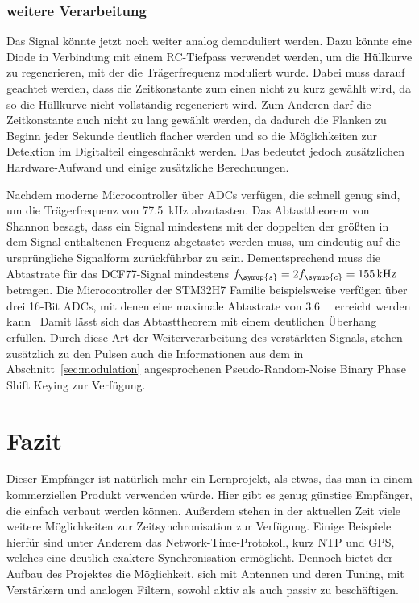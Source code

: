 \documentclass[a4paper]{scrartcl}
\begin{document}
\subsubsection{weitere Verarbeitung}
Das Signal könnte jetzt noch weiter analog demoduliert werden. Dazu könnte eine Diode in Verbindung mit einem RC-Tiefpass verwendet werden, um die Hüllkurve zu regenerieren, mit der die Trägerfrequenz moduliert wurde.
Dabei muss darauf geachtet werden, dass die Zeitkonstante zum einen nicht zu kurz gewählt wird, da so die Hüllkurve nicht vollständig regeneriert wird.
Zum Anderen darf die Zeitkonstante auch nicht zu lang gewählt werden, da dadurch die Flanken zu Beginn jeder Sekunde deutlich flacher werden und so die Möglichkeiten zur Detektion im Digitalteil eingeschränkt werden.
Das bedeutet jedoch zusätzlichen Hardware-Aufwand und einige zusätzliche Berechnungen.

Nachdem moderne Microcontroller über ADCs verfügen, die schnell genug sind, um die Trägerfrequenz von \qty{77.5}{\kHz} abzutasten.
Das Abtasttheorem von Shannon besagt, dass ein Signal mindestens mit der doppelten der größten in dem Signal enthaltenen Frequenz abgetastet werden muss, um eindeutig auf die ursprüngliche Signalform zurückführbar zu sein.
Dementsprechend muss die Abtastrate für das DCF77-Signal mindestens \(f_{\symup{s}} = 2 f_{\symup{c}} = \qty{155}{\kHz}\) betragen.
Die Microcontroller der STM32H7 Familie beispielsweise verfügen über drei 16-Bit ADCs, mit denen eine maximale Abtastrate von \qty{3.6}{\mega\samples} erreicht werden kann~\cite{stmicroelectronics_getting_2020}
Damit lässt sich das Abtasttheorem mit einem deutlichen Überhang erfüllen.
Durch diese Art der Weiterverarbeitung des verstärkten Signals, stehen zusätzlich zu den Pulsen auch die Informationen aus dem in Abschnitt~\ref{sec:modulation} angesprochenen Pseudo-Random-Noise Binary Phase Shift Keying zur Verfügung.

\section{Fazit}
Dieser Empfänger ist natürlich mehr ein Lernprojekt, als etwas, das man in einem kommerziellen Produkt verwenden würde.
Hier gibt es genug günstige Empfänger, die einfach verbaut werden können.
Außerdem stehen in der aktuellen Zeit viele weitere Möglichkeiten zur Zeitsynchronisation zur Verfügung. Einige Beispiele hierfür sind unter Anderem das Network-Time-Protokoll, kurz NTP und GPS, welches eine deutlich exaktere Synchronisation ermöglicht.
Dennoch bietet der Aufbau des Projektes die Möglichkeit, sich mit Antennen und deren Tuning, mit Verstärkern und analogen Filtern, sowohl aktiv als auch passiv zu beschäftigen.
\clearpage
\printbibliography
\end{document}
